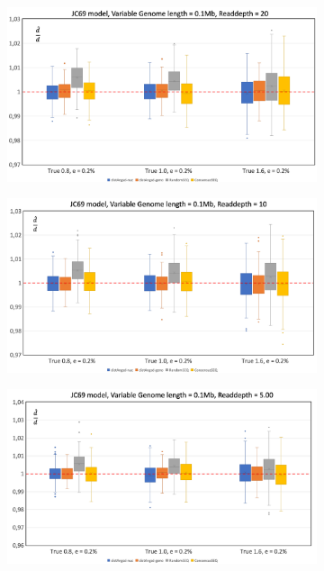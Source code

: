 \documentclass{article}
\begin{document}
\begin{figure}[h]
    \centering
    \begin{subfigure}[b]{0.475\textwidth}
         \centering
         \includegraphics[width=\textwidth]{JCRD20_01Mb.png}
         \caption{}
         \label{fig:JCRD20_01Mb}
     \end{subfigure}
     \begin{subfigure}[b]{0.475\textwidth}
         \centering
         \includegraphics[width=\textwidth]{JCRD10_01Mb.png}
         \caption{}
         \label{fig:JCRD10_01Mb}
     \end{subfigure}
     \begin{subfigure}[b]{0.475\textwidth}
         \centering
         \includegraphics[width=\textwidth]{JCRD5_01Mb.png}

\end{subfigure}
\end{figure}
\end{document}
